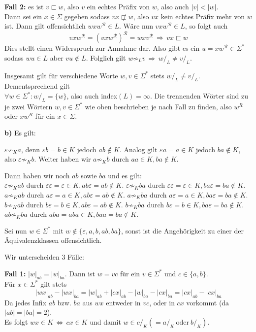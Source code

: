 \documentclass[a4paper,graphics,11pt]{article}
\begin{document}
\textbf{Fall 2:} es ist $v \sqsubset w$, also $v$ ein echtes Präfix von $w$, also auch $|v| < |w|$.\\[5pt]
Dann sei ein $x \in \Sigma$ gegeben sodass $vx \not\sqsubset w$, also $vx$ kein echtes Präfix mehr von $w$ ist.
Dann gilt offensichtlich $wxw^\mathcal{R} \in L$. Wäre nun $vxw^\mathcal{R} \in L$, so folgt auch
$$
    vxw^\mathcal{R} = (vxw^\mathcal{R})^\mathcal{R} = wxv^\mathcal{R} \,\Longrightarrow\, vx \sqsubset w
$$
Dies stellt einen Widerspruch zur Annahme dar. Also gibt es ein $u = xw^\mathcal{R} \in \Sigma^*$ sodass
$wu \in L$ aber $vu \notin L$. Folglich gilt $w \not\sim_L v \,\Longrightarrow\, w/_L \neq v/_L$.

Insgesamt gilt für verschiedene Worte $w,v \in \Sigma^*$ stets $w/_L \neq v/_L$.
Dementsprechend gilt\\
$\forall w \in \Sigma^* : w/_L = \{w\}$, also auch index$(L) = \infty$.
Die trennenden Wörter sind zu je zwei Wörtern $w,v \in \Sigma^*$ wie oben beschrieben je nach Fall zu finden,
also $w^R$ oder $xw^R$ für ein $x \in \Sigma$.

\textbf{b)} Es gilt:

$\varepsilon \not\sim_K a$, denn $\varepsilon b = b \in K$ jedoch $ab \notin K$. Analog gilt
$\varepsilon a = a \in K$ jedoch $ba \notin K$, also $\varepsilon \not\sim_K b$.
Weiter haben wir $a \not\sim_K b$ durch $aa \in K, ba \notin K$.

Dann haben wir noch $ab$ sowie $ba$ und es gilt:\\
$\varepsilon \not\sim_K ab$ durch $\varepsilon\varepsilon = \varepsilon \in K, ab\varepsilon = ab \notin K$.
$\varepsilon \not\sim_K ba$ durch $\varepsilon\varepsilon = \varepsilon \in K, ba\varepsilon = ba \notin K$.\\
$a \not\sim_K ab$ durch $a\varepsilon = a \in K, ab\varepsilon = ab \notin K$.
$a \not\sim_K ba$ durch $a\varepsilon = a \in K, ba\varepsilon = ba \notin K$.\\
$b \not\sim_K ab$ durch $b\varepsilon = b \in K, ab\varepsilon = ab \notin K$.
$b \not\sim_K ba$ durch $b\varepsilon = b \in K, ba\varepsilon = ba \notin K$.\\
$ab \not\sim_K ba$ durch $aba = aba \in K, baa = ba \notin K$.

Sei nun $w \in \Sigma^*$ mit $w \notin \{\varepsilon, a, b, ab, ba\}$, sonst ist die Angehörigkeit zu einer
der Äquivalenzklassen offensichtlich.

Wir unterscheiden $3$ Fälle:

\textbf{Fall 1:} $|w|_{ab} = |w|_{ba}$. Dann ist $w = vc$ für ein $v \in \Sigma^*$ und $c \in \{a,b\}$.\\
Für $x \in \Sigma^*$ gilt stets
$$
    |wx|_{ab} - |wx|_{ba} = |w|_{ab} + |cx|_{ab} - |w|_{ba} - |cx|_{ba} = |cx|_{ab} - |cx|_{ba}
$$
Da jedes Infix $ab$ bzw. $ba$ aus $wx$ entweder in $vc$, oder in $cx$ vorkommt (da $|ab| = |ba| = 2$).\\
Es folgt $wx \in K \,\Longleftrightarrow\, cx \in K$ und damit $w \in c/_K (= a/_K\ \text{oder}\ b/_K)$.
\end{document}
